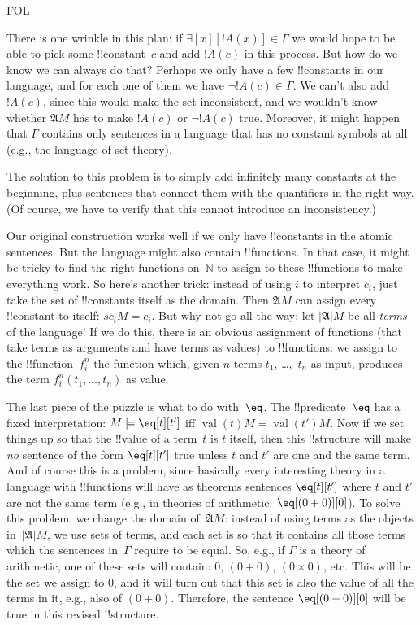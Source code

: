 \documentclass[10pt,a4paper]{article}
\theoremstyle{plain}
\theoremstyle{definition}
\theoremstyle{remark}
\providecommand{\lexists}{\mathord{\exists}}
\providecommand{\Obj}{}
\providecommand{\Struct}{\ensuremath{\mathfrak{A}}}
\providecommand{\Domain}{\ensuremath{|\mathfrak{A}|}}
\providecommand{\Assign}{\ensuremath{s}}
\providecommand{\Sat}[2]{\ensuremath{#1 \models #2}}
\providecommand{\Nat}{\ensuremath{\mathbb{N}}}
\providecommand{\iftag}[1]{#1}
\providecommand{\Value}[1]{\operatorname{val}(#1)}
\begin{document}
\iftag{FOL}{%
There is one wrinkle in this plan: if $\lexists[x][!A(x)] \in \Gamma$
we would hope to be able to pick some !!{constant}~$c$ and add $!A(c)$
in this process.  But how do we know we can always do that?  Perhaps we
only have a few !!{constant}s in our language, and for each one of
them we have $\lnot !A(c) \in \Gamma$.  We can't also add $!A(c)$,
since this would make the set inconsistent, and we wouldn't know
whether $\Struct{M}$ has to make $!A(c)$ or $\lnot !A(c)$ true.
Moreover, it might happen that $\Gamma$ contains only sentences in a
language that has no constant symbols at all (e.g., the language of
set theory).

The solution to this problem is to simply add infinitely many
constants at the beginning, plus sentences that connect them with the
quantifiers in the right way.  (Of course, we have to verify that this
cannot introduce an inconsistency.)

Our original construction works well if we only have !!{constant}s in
the atomic sentences.  But the language might also contain
!!{function}s.  In that case, it might be tricky to find the right
functions on~$\Nat$ to assign to these !!{function}s to make
everything work.  So here's another trick: instead of using $i$ to
interpret $\Obj c_i$, just take the set of !!{constant}s itself as the
domain.  Then $\Struct M$ can assign every !!{constant} to itself:
$\Assign{\Obj c_i}{M} = \Obj c_i$.  But why not go all the way: let
$\Domain{M}$ be all \emph{terms} of the language!{} If we do this,
there is an obvious assignment of functions (that take terms as
arguments and have terms as values) to !!{function}s: we assign to the
!!{function}~$\Obj f^n_i$ the function which, given $n$ terms $t_1$,
\dots,~$t_n$ as input, produces the term $\Obj f^n_i(t_1, \dots, t_n)$
as value.

The last piece of the puzzle is what to do with~$\eq$.  The
!!{predicate}~$\eq$ has a fixed interpretation: $\Sat{M}{\eq[t][t']}$
iff $\Value{t}{M} = \Value{t'}{M}$.  Now if we set things up so that the
!!{value} of a term~$t$ is $t$ itself, then this !!{structure}
will make \emph{no} sentence of the form $\eq[t][t']$ true
unless $t$ and $t'$ are one and the same term.  And of
course this is a problem, since basically every interesting theory in
a language with !!{function}s will have as theorems sentences
$\eq[t][t']$ where $t$ and $t'$ are not the same term (e.g., in
theories of arithmetic: $\eq[(\Obj 0+ \Obj 0)][\Obj 0]$).  To solve
this problem, we change the domain of~$\Struct M$: instead of using terms as
the objects in~$\Domain{M}$, we use sets of terms, and each set is so
that it contains all those terms which the sentences in~$\Gamma$
require to be equal.  So, e.g., if $\Gamma$ is a theory of arithmetic,
one of these sets will contain: $\Obj 0$, $(\Obj 0 + \Obj 0)$, $(\Obj
0 \times \Obj 0)$, etc.  This will be the set we assign to $\Obj 0$,
and it will turn out that this set is also the value of all the terms
in it, e.g., also of $(\Obj 0 + \Obj 0)$.  Therefore, the sentence
$\eq[(\Obj 0+ \Obj 0)][\Obj 0]$ will be true in this revised
!!{structure}.}{}
\end{document}
